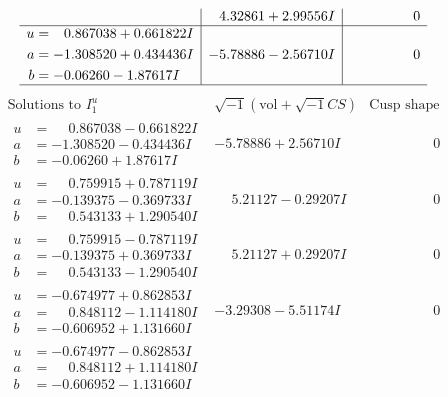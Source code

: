 \documentclass[1p]{elsarticle_modified}
\theoremstyle{definition}
\newcommand{\I}{\sqrt{-1}}
\begin{document}
$$\begin{array}{c|c|c}
 & \phantom{-}4.32861 + 2.99556 I & \phantom{-0.000000 } 0 \\ \hline\begin{aligned}
u &= \phantom{-}0.867038 + 0.661822 I \\
a &= -1.308520 + 0.434436 I \\
b &= -0.06260 - 1.87617 I\end{aligned}
 & -5.78886 - 2.56710 I & \phantom{-0.000000 } 0\\
 \hline 
 \end{array}$$\newpage$$\begin{array}{c|c|c}  
\text{Solutions to }I^u_{1}& \I (\text{vol} + \sqrt{-1}CS) & \text{Cusp shape}\\
 \hline 
\begin{aligned}
u &= \phantom{-}0.867038 - 0.661822 I \\
a &= -1.308520 - 0.434436 I \\
b &= -0.06260 + 1.87617 I\end{aligned}
 & -5.78886 + 2.56710 I & \phantom{-0.000000 } 0 \\ \hline\begin{aligned}
u &= \phantom{-}0.759915 + 0.787119 I \\
a &= -0.139375 - 0.369733 I \\
b &= \phantom{-}0.543133 + 1.290540 I\end{aligned}
 & \phantom{-}5.21127 - 0.29207 I & \phantom{-0.000000 } 0 \\ \hline\begin{aligned}
u &= \phantom{-}0.759915 - 0.787119 I \\
a &= -0.139375 + 0.369733 I \\
b &= \phantom{-}0.543133 - 1.290540 I\end{aligned}
 & \phantom{-}5.21127 + 0.29207 I & \phantom{-0.000000 } 0 \\ \hline\begin{aligned}
u &= -0.674977 + 0.862853 I \\
a &= \phantom{-}0.848112 - 1.114180 I \\
b &= -0.606952 + 1.131660 I\end{aligned}
 & -3.29308 - 5.51174 I & \phantom{-0.000000 } 0 \\ \hline\begin{aligned}
u &= -0.674977 - 0.862853 I \\
a &= \phantom{-}0.848112 + 1.114180 I \\
b &= -0.606952 - 1.131660 I\end{aligned}

\end{array}$$
\end{document}
